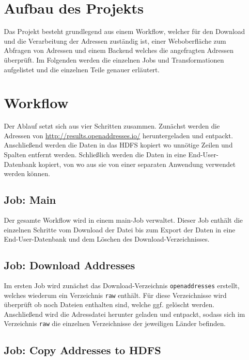 \documentclass[
	a4paper,
	12p,
	bibliography=totocnumbered
]{scrartcl}
\begin{document}
\section{Aufbau des Projekts}

Das Projekt besteht grundlegend aus einem Workflow, welcher für den Download und die Verarbeitung der Adressen zuständig ist, einer Weboberfläche zum Abfragen von Adressen und einem Backend welches die angefragten Adressen überprüft. Im Folgenden werden die einzelnen Jobs und Transformationen aufgelistet und die einzelnen Teile genauer erläutert.


\section{Workflow}

Der Ablauf setzt sich aus vier Schritten zusammen. Zunächst werden die Adressen von \url{http://results.openaddresses.io/} heruntergeladen und entpackt. Anschließend werden die Daten in das HDFS kopiert wo unnötige Zeilen und Spalten entfernt werden. Schließlich werden die Daten in eine End-User-Datenbank kopiert, von wo aus sie von einer separaten Anwendung verwendet werden können.


\subsection{Job: Main}

Der gesamte Workflow wird in einem main-Job verwaltet. Dieser Job enthält die einzelnen Schritte vom Download der Datei bis zum Export der Daten in eine End-User-Datenbank und dem Löschen des Download-Verzeichnisses. 


\subsection{Job: Download Addresses}

Im ersten Job wird zunächst das Download-Verzeichnis \texttt{openaddresses} erstellt, welches wiederum ein Verzeichnis \texttt{raw} enthält. Für diese Verzeichnisse wird überprüft ob noch Dateien enthalten sind, welche ggf. gelöscht werden. Anschließend wird die Adressdatei herunter geladen und entpackt, sodass sich im Verzeichnis \texttt{raw} die einzelnen Verzeichnisse der jeweiligen Länder befinden.


\subsection{Job: Copy Addresses to HDFS}
\end{document}

